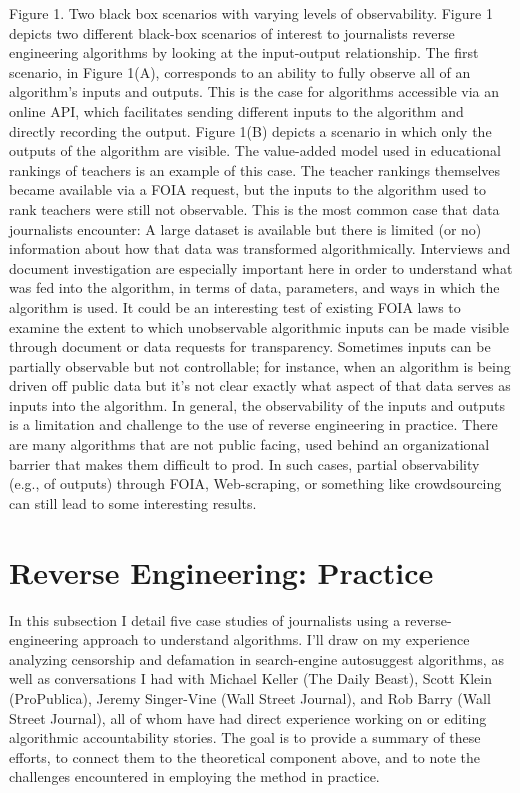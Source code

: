Figure 1. Two black box scenarios with varying levels of observability. 
Figure 1 depicts two different black-box scenarios of interest to journalists reverse engineering algorithms by looking at the input-output relationship. The first scenario, in Figure 1(A), corresponds to an ability to fully observe all of an algorithm's inputs and outputs. This is the case for algorithms accessible via an online API, which facilitates sending different inputs to the algorithm and directly recording the output. 
Figure 1(B) depicts a scenario in which only the outputs of the algorithm are visible. The value-added model used in educational rankings of teachers is an example of this case. The teacher rankings themselves became available via a FOIA request, but the inputs to the algorithm used to rank teachers were still not observable. This is the most common case that data journalists encounter: A large dataset is available but there is limited (or no) information about how that data was transformed algorithmically. Interviews and document investigation are especially important here in order to understand what was fed into the algorithm, in terms of data, parameters, and ways in which the algorithm is used. It could be an interesting test of existing FOIA laws to examine the extent to which unobservable algorithmic inputs can be made visible through document or data requests for transparency. 
Sometimes inputs can be partially observable but not controllable; for instance, when an algorithm is being driven off public data but it's not clear exactly what aspect of that data serves as inputs into the algorithm. In general, the observability of the inputs and outputs is a limitation and challenge to the use of reverse engineering in practice. There are many algorithms that are not public facing, used behind an organizational barrier that makes them difficult to prod. In such cases, partial observability (e.g., of outputs) through FOIA, Web-scraping, or something like crowdsourcing can still lead to some interesting results. 
\chapter{Reverse Engineering: Practice }
In this subsection I detail five case studies of journalists using a reverse-engineering approach to understand algorithms. I'll draw on my experience analyzing censorship and defamation in search-engine autosuggest algorithms, as well as conversations I had with Michael Keller (The Daily Beast), Scott Klein (ProPublica), Jeremy Singer-Vine (Wall Street Journal), and Rob Barry (Wall Street Journal), all of whom have had direct experience working on or editing algorithmic accountability stories. The goal is to provide a summary of these efforts, to connect them to the theoretical component above, and to note the challenges encountered in employing the method in practice.

